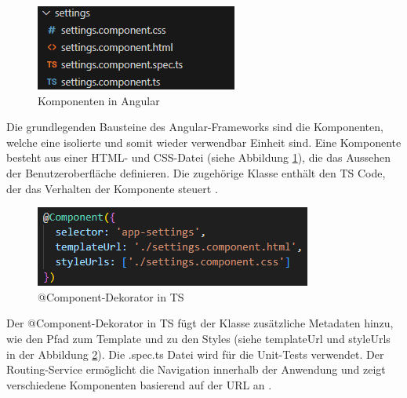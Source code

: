 \begin{figure}[h]
    \centering
    \includegraphics[clip,width=0.5\linewidth]{images/Komponente.png}
    \caption[Komponenten in Angular]{Komponenten in Angular}
    \label{KomponentenAngular}
\end{figure}

Die grundlegenden Bausteine des Angular-Frameworks sind die Komponenten, welche eine isolierte und somit wieder verwendbar Einheit sind. 
Eine Komponente besteht aus einer HTML- und CSS-Datei (siehe Abbildung \ref{KomponentenAngular}), die das Aussehen der Benutzeroberfläche definieren. Die zugehörige Klasse enthält den TS Code, der das Verhalten der Komponente steuert \cite{angular_arch}.

\begin{figure}[h]
    \centering
    \includegraphics[clip,width=0.5\linewidth]{images/@Component.png}
    \caption[@Component-Dekorator in TypeScript]{@Component-Dekorator in TS}
    \label{Component}
\end{figure}

Der @Component-Dekorator in TS fügt der Klasse zusätzliche Metadaten hinzu, wie den Pfad zum Template und zu den Styles (siehe templateUrl und styleUrls in der Abbildung \ref{Component}). Die .spec.ts Datei wird für die Unit-Tests verwendet.
Der Routing-Service ermöglicht die Navigation innerhalb der Anwendung und zeigt verschiedene Komponenten basierend auf der URL an \cite{angular_arch}.

